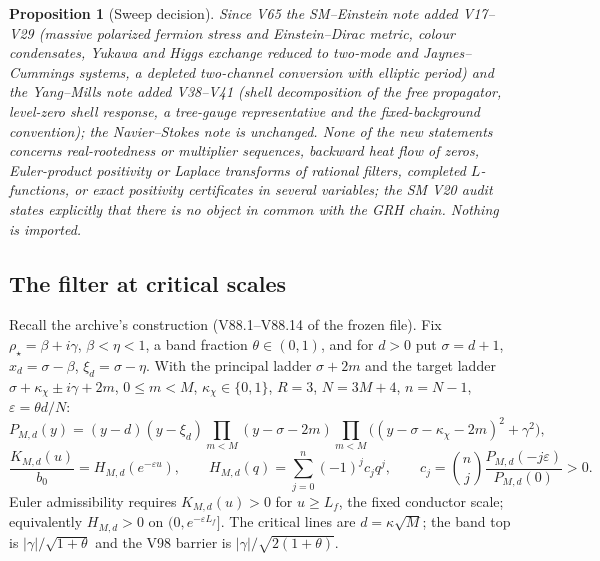 \documentclass[11pt]{article}
\newtheorem{proposition}[theorem]{Proposition}
\theoremstyle{definition}
\theoremstyle{remark}
\begin{document}
\begin{proposition}[Sweep decision]
\label{prop:f2v70-sweep}
Since V65 the SM--Einstein note added V17--V29 (massive polarized
fermion stress and Einstein--Dirac metric, colour condensates, Yukawa and
Higgs exchange reduced to two-mode and Jaynes--Cummings systems, a
depleted two-channel conversion with elliptic period) and the
Yang--Mills note added V38--V41 (shell decomposition of the free
propagator, level-zero shell response, a tree-gauge representative and
the fixed-background convention); the Navier--Stokes note is unchanged.
None of the new statements concerns real-rootedness or multiplier
sequences, backward heat flow of zeros, Euler-product positivity or
Laplace transforms of rational filters, completed \(L\)-functions, or
exact positivity certificates in several variables; the SM V20 audit
states explicitly that there is no object in common with the GRH chain.
Nothing is imported.
\end{proposition}


\subsection{The filter at critical scales}

Recall the archive's construction (V88.1--V88.14 of the frozen file).
Fix \(\rho_\star=\beta+i\gamma\), \(\beta<\eta<1\), a band fraction
\(\theta\in(0,1)\), and for \(d>0\) put \(\sigma=d+1\), \(x_d=\sigma-\beta\),
\(\xi_d=\sigma-\eta\).  With the principal ladder \(\sigma+2m\) and the
target ladder \(\sigma+\kappa_\chi\pm i\gamma+2m\), \(0\le m<M\),
\(\kappa_\chi\in\{0,1\}\), \(R=3\), \(N=3M+4\), \(n=N-1\),
\(\varepsilon=\theta d/N\):
\begin{equation}
 P_{M,d}(y)=(y-d)(y-\xi_d)\prod_{m<M}(y-\sigma-2m)
 \prod_{m<M}\bigl((y-\sigma-\kappa_\chi-2m)^2+\gamma^2\bigr),
 \label{eq:f2v70-P}
\end{equation}
\begin{equation}
 \frac{K_{M,d}(u)}{b_0}=H_{M,d}(e^{-\varepsilon u}),\qquad
 H_{M,d}(q)=\sum_{j=0}^n(-1)^jc_jq^j,\qquad
 c_j=\binom nj\frac{P_{M,d}(-j\varepsilon)}{P_{M,d}(0)}>0 .
 \label{eq:f2v70-H}
\end{equation}
Euler admissibility requires \(K_{M,d}(u)>0\) for \(u\ge L_f\), the fixed
conductor scale; equivalently \(H_{M,d}>0\) on \((0,e^{-\varepsilon L_f}]\).
The critical lines are \(d=\kappa\sqrt M\); the band top is
\(|\gamma|/\sqrt{1+\theta}\) and the V98 barrier is
\(|\gamma|/\sqrt{2(1+\theta)}\).
\end{document}
